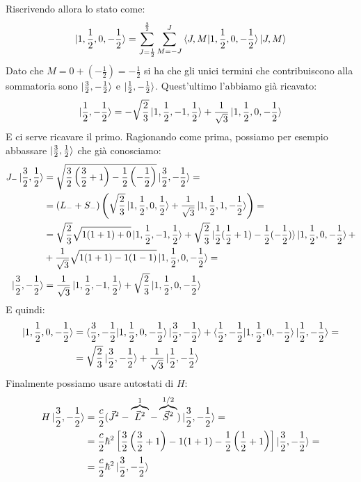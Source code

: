 \documentclass[../../FisicaTeorica.tex]{subfiles}
\begin{document}
\begin{enumerate}
Riscrivendo allora lo stato come:
\begin{align*}
\ket{1,\frac{1}{2},0,-\frac{1}{2}}=\sum_{J=\frac{1}{2}}^{\frac{3}{2}} \sum_{M=-J}^{J} \braket{J,M|1,\frac{1}{2},0,-\frac{1}{2}} \ket{J,M}
\end{align*}
Dato che $M=0+(-\frac{1}{2})=-\frac{1}{2}$ si ha che gli unici termini che contribuiscono alla sommatoria sono $\ket{\frac{3}{2},-\frac{1}{2}}$ e $\ket{\frac{1}{2},-\frac{1}{2}}$. Quest'ultimo l'abbiamo già ricavato:
\[
\ket{\frac{1}{2},-\frac{1}{2}}=-\sqrt{\frac{2}{3}}\ket{1,\frac{1}{2},-1,\frac{1}{2}} + \frac{1}{\sqrt{3}}\ket{1,\frac{1}{2},0,-\frac{1}{2}}
\]
E ci serve ricavare il primo. Ragionando come prima, possiamo per esempio abbassare $\ket{\frac{3}{2}, \frac{1}{2}}$ che già conosciamo:
\begin{align*}
J_- \ket{\frac{3}{2},\frac{1}{2}}&=\sqrt{\frac{3}{2}\left(\frac{3}{2}+1\right)-\frac{1}{2}\left(-\frac{1}{2}\right)}\ket{\frac{3}{2},-\frac{1}{2}} =\\
&=(L_- + S_-)\left(\sqrt{\frac{2}{3}}\ket{1,\frac{1}{2},0,\frac{1}{2}} +\frac{1}{\sqrt{3}}\ket{1,\frac{1}{2},1,-\frac{1}{2}}\right)=\\
&=\sqrt{\frac{2}{3}}\sqrt{1(1+1)+0}\ket{1,\frac{1}{2},-1,\frac{1}{2}}+\sqrt{\frac{2}{3}}\ket{\frac{1}{2}(\frac{1}{2}+1)-\frac{1}{2}(-\frac{1}{2})}\ket{1,\frac{1}{2},0,-\frac{1}{2}}+\\
&+\frac{1}{\sqrt{3}} \sqrt{1(1+1)-1(1-1)}\ket{1,\frac{1}{2},0,-\frac{1}{2}}=
\\
\ket{\frac{3}{2},-\frac{1}{2}} &= \frac{1}{\sqrt{3}}\ket{1,\frac{1}{2},-1,\frac{1}{2}}+\sqrt{\frac{2}{3}}\ket{1,\frac{1}{2},0,-\frac{1}{2}}
\end{align*}
E quindi:
\begin{align*}
\ket{1,\frac{1}{2},0,-\frac{1}{2}} &= \braket{\frac{3}{2},-\frac{1}{2}|1,\frac{1}{2},0,-\frac{1 }{2}}\ket{\frac{3}{2},-\frac{1}{2}}+ \braket{\frac{1}{2},-\frac{1}{2}|1,\frac{1}{2},0,-\frac{1}{2}}\ket{\frac{1}{2},-\frac{1}{2}}=\\
&=\sqrt{\frac{2}{3}}\ket{\frac{3}{2},-\frac{1}{2}} +\frac{1}{\sqrt{3}}\ket{\frac{1}{2},-\frac{1}{2}}
\end{align*}
Finalmente possiamo usare autostati di $H$:
\begin{align*}
H\ket{\frac{3}{2},-\frac{1}{2}}&=\frac{c}{2}(\vec{J}^2-\overbrace{\vec{L}^2}^{1}-\overbrace{\vec{S}^2}^{1/2})\ket{\frac{3}{2},-\frac{1}{2}}=\\
&= \frac{c}{2}\hbar^2 \left[\frac{3}{2}\left(\frac{3}{2}+1\right)-1(1+1)-\frac{1}{2}\left(\frac{1}{2}+1\right)\right]\ket{\frac{3}{2},-\frac{1}{2}}=\\
&=\frac{c}{2}\hbar^2\ket{\frac{3}{2},-\frac{1}{2}}
\end{align*}


\end{enumerate}
\end{document}
